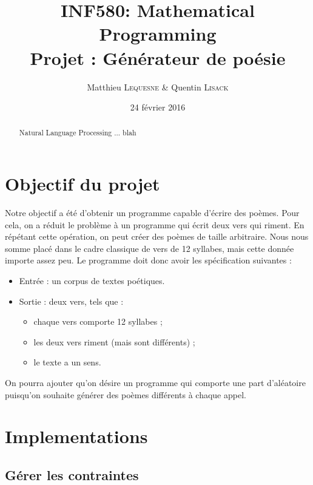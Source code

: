 \documentclass[a4paper,11pt]{article}
\title{INF580: Mathematical Programming \\ Projet : Générateur de poésie}
\author{Matthieu \textsc{Lequesne} \& Quentin \textsc{Lisack}}
\date{24 février 2016}
\begin{document}
\maketitle
\setcounter{tocdepth}{2}
\tableofcontents

\vspace{1cm}

\begin{abstract}
Natural Language Processing ... blah
\end{abstract}

\vfill

\newpage

\section{Objectif du projet}

Notre objectif a été d'obtenir un programme capable d'écrire des poèmes. Pour cela, on a réduit le problème à un programme qui écrit deux vers qui riment. En répétant cette opération, on peut créer des poèmes de taille arbitraire. Nous nous somme placé dans le cadre classique de vers de 12 syllabes, mais cette donnée importe assez peu. Le programme doit donc avoir les spécification suivantes :

\begin{itemize}
\item Entrée : un corpus de textes poétiques.
\item Sortie : deux vers, tels que :
\begin{itemize}
\item chaque vers comporte 12 syllabes ;
\item les deux vers riment (mais sont différents) ;
\item le texte a un sens.
\end{itemize}
\end{itemize}

On pourra ajouter qu'on désire un programme qui comporte une part d'aléatoire puisqu'on souhaite générer des poèmes différents à chaque appel.

\section{Implementations}

\subsection{Gérer les contraintes}
\end{document}
